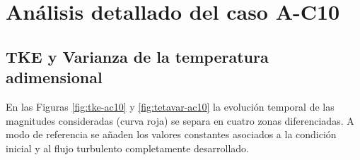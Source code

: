 \section{Análisis detallado del caso A-C10} \label{sec:ac10}

\subsection{TKE y Varianza de la temperatura adimensional}

En las Figuras \ref{fig:tke-ac10} y \ref{fig:tetavar-ac10} la evolución temporal de las magnitudes consideradas (curva roja) se separa en cuatro zonas diferenciadas. A modo de referencia se añaden los valores constantes asociados a la condición inicial y al flujo turbulento completamente desarrollado.

